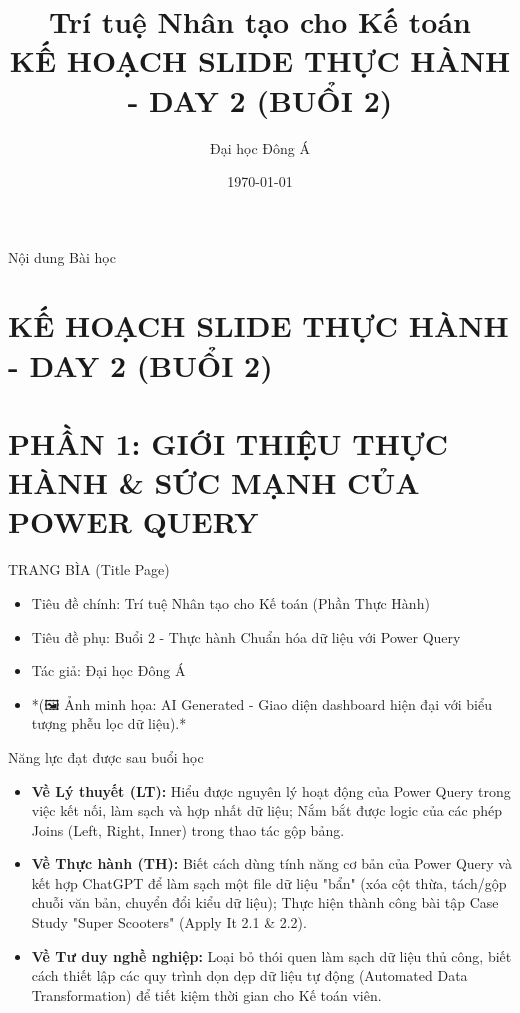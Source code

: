 \documentclass[aspectratio=169]{beamer}
\title[Trí tuệ Nhân tạo cho Kế toán]{Trí tuệ Nhân tạo cho Kế toán \\ \vspace{0.3cm} \Large KẾ HOẠCH SLIDE THỰC HÀNH - DAY 2 (BUỔI 2)}
\author{Đại học Đông Á}
\date{\today}
\begin{document}
\begin{frame}
    \titlepage
\end{frame}

\begin{frame}{Nội dung Bài học}
    \tableofcontents
\end{frame}


\section{KẾ HOẠCH SLIDE THỰC HÀNH - DAY 2 (BUỔI 2)}


\section{PHẦN 1: GIỚI THIỆU THỰC HÀNH \& SỨC MẠNH CỦA POWER QUERY}


\begin{frame}{TRANG BÌA (Title Page)}
    \begin{itemize}
        \item Tiêu đề chính: Trí tuệ Nhân tạo cho Kế toán (Phần Thực Hành)
        \item Tiêu đề phụ: Buổi 2 - Thực hành Chuẩn hóa dữ liệu với Power Query
        \item Tác giả: Đại học Đông Á
        \item *(🖼️ Ảnh minh họa: AI Generated - Giao diện dashboard hiện đại với biểu tượng phễu lọc dữ liệu).*
    \end{itemize}
\end{frame}


\begin{frame}{Năng lực đạt được sau buổi học}
    \begin{itemize}
        \item \textbf{Về Lý thuyết (LT):} Hiểu được nguyên lý hoạt động của Power Query trong việc kết nối, làm sạch và hợp nhất dữ liệu; Nắm bắt được logic của các phép Joins (Left, Right, Inner) trong thao tác gộp bảng.
        \item \textbf{Về Thực hành (TH):} Biết cách dùng tính năng cơ bản của Power Query và kết hợp ChatGPT để làm sạch một file dữ liệu "bẩn" (xóa cột thừa, tách/gộp chuỗi văn bản, chuyển đổi kiểu dữ liệu); Thực hiện thành công bài tập Case Study "Super Scooters" (Apply It 2.1 \& 2.2).
        \item \textbf{Về Tư duy nghề nghiệp:} Loại bỏ thói quen làm sạch dữ liệu thủ công, biết cách thiết lập các quy trình dọn dẹp dữ liệu tự động (Automated Data Transformation) để tiết kiệm thời gian cho Kế toán viên.
    \end{itemize}
\end{frame}
\end{document}
